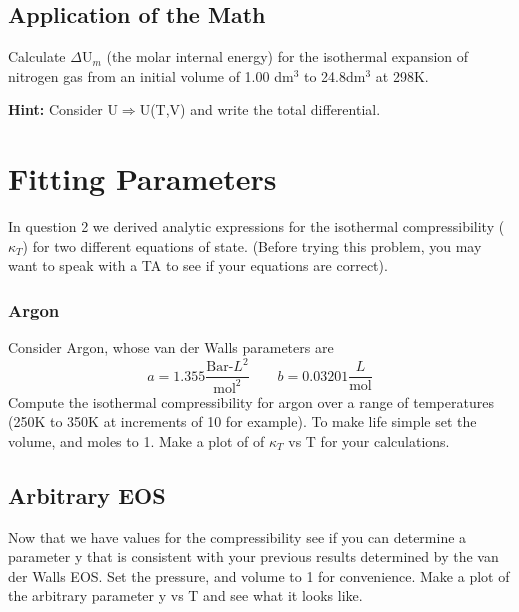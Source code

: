 \documentclass{article}
\newcommand{\be}{\begin{equation}}
\newcommand{\ee}{\end{equation}}
\begin{document}
\subsection{Application of the Math}
Calculate $\Delta$U$_m$ (the molar internal energy) for the isothermal expansion of nitrogen gas from an initial volume of 1.00 dm$^3$ to 24.8dm$^3$ at 298K. 

\textbf{Hint:} Consider U$\Rightarrow$U(T,V) and write the total differential. 

\section{Fitting Parameters}
In question 2 we derived analytic expressions for the isothermal compressibility ($\kappa_T$) for two different equations of state.
(Before trying this problem, you may want to speak with a TA to see if your equations are correct). 

\subsubsection*{Argon}
Consider Argon, whose van der Walls parameters are
\be
a = 1.355 \frac{\text{Bar-}L^2}{\text{mol}^2} \qquad b = 0.03201 \frac{L}{\text{mol}}
\ee
Compute the isothermal compressibility for argon over a range of temperatures (250K to 350K at increments of 10 for example). 
To make life simple set the volume, and moles to 1. 
Make a plot of of $\kappa_T$ vs T for your calculations. 

\subsection{Arbitrary EOS}
Now that we have values for the compressibility see if you can determine a parameter y that is consistent with your previous results determined by the van der Walls EOS. 
Set the pressure, and volume to 1 for convenience. 
Make a plot of the arbitrary parameter y vs T and see what it looks like.
\end{document}
